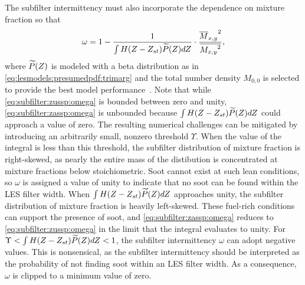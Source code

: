 The subfilter intermittency must also incorporate the dependence on mixture fraction so that
\begin{equation}\label{eq:subfilter:zassp:omega}
  \omega = 1 - \frac{1}{\int H(Z - Z_{st})\widetilde{P}(Z) dZ} \cdot \frac{{\overline{M}_{x,y}}^2}{\overline{{M_{x,y}}^2}},
\end{equation}
where $\widetilde{P}(Z)$ is modeled with a beta distribution as in \cref{eq:lesmodels:presumedpdf:trimarg} and the total number density $M_{0,0}$ is selected to provide the best model performance~\cite{subfilterpdf2011}. Note that while \cref{eq:subfilter:zussp:omega} is bounded between zero and unity, \cref{eq:subfilter:zassp:omega} is unbounded because $\int H(Z - Z_{st})\widetilde{P}(Z) dZ$ could approach a value of zero. The resulting numerical challenges can be mitigated by introducing an arbitrarily small, nonzero threshold $\Upsilon$. When the value of the integral is less than this threshold, the subfilter distribution of mixture fraction is right-skewed, as nearly the entire mass of the distibution is concentrated at mixture fractions below stoichiometric. Soot cannot exist at such lean conditions, so $\omega$ is assigned a value of unity to indicate that no soot can be found within the LES filter width. When $\int H(Z - Z_{st})\widetilde{P}(Z) dZ$ approaches unity, the subfilter distribution of mixture fraction is heavily left-skewed. These fuel-rich conditions can support the presence of soot, and \cref{eq:subfilter:zassp:omega} reduces to \cref{eq:subfilter:zussp:omega} in the limit that the integral evaluates to unity. For $\Upsilon < \int H(Z - Z_{st})\widetilde{P}(Z) dZ < 1$, the subfilter intermittency $\omega$ can adopt negative values. This is nonsensical, as the subfilter intermittency should be interpreted as the probability of not finding soot within an LES filter width. As a consequence, $\omega$ is clipped to a minimum value of zero.

